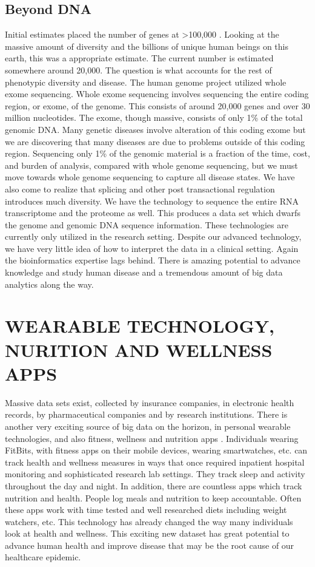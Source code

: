 \documentclass[sigconf]{acmart}
\begin{document}
\subsection{	Beyond DNA}

Initial estimates placed the number of genes at >100,000 \cite{vanderbilt}.  Looking
at the massive amount of diversity and the billions of unique human
beings on this earth, this was a appropriate estimate.  The current
number is estimated somewhere around 20,000.  The question is what
accounts for the rest of phenotypic diversity and disease.  The human
genome project utilized whole exome sequencing.  Whole exome
sequencing involves sequencing the entire coding region, or exome, of
the genome.  This consists of around 20,000 genes and over 30 million
nucleotides.  The exome, though massive, consists of only 1\% of the
total genomic DNA.  Many genetic diseases involve alteration of this
coding exome but we are discovering that many diseases are due to
problems outside of this coding region.  Sequencing only 1\% of the
genomic material is a fraction of the time, cost, and burden of
analysis, compared with whole genome sequencing, but we must move
towards whole genome sequencing to capture all disease states.  We
have also come to realize that splicing and other post transactional
regulation introduces much diversity.  We have the technology to
sequence the entire RNA transcriptome and the proteome as well.  This
produces a data set which dwarfs the genome and genomic DNA sequence
information.  These technologies are currently only utilized in the
research setting.  Despite our advanced technology, we have very
little idea of how to interpret the data in a clinical setting.  Again
the bioinformatics expertise lags behind.  There is amazing potential
to advance knowledge and study human disease and a tremendous amount
of big data analytics along the way.

\section{WEARABLE TECHNOLOGY, NURITION AND WELLNESS APPS}

Massive data sets exist, collected by insurance companies, in
electronic health records, by pharmaceutical companies and by research
institutions.  There is another very exciting source of big data on
the horizon, in personal wearable technologies, and also fitness,
wellness and nutrition apps \cite{fox6}.  Individuals wearing FitBits, with
fitness apps on their mobile devices, wearing smartwatches, etc. can
track health and wellness measures in ways that once required
inpatient hospital monitoring and sophisticated research lab settings.
They track sleep and activity throughout the day and night.  In
addition, there are countless apps which track nutrition and health.
People log meals and nutrition to keep accountable.  Often these apps
work with time tested and well researched diets including weight
watchers, etc.  This technology has already changed the way many
individuals look at health and wellness.  This exciting new dataset
has great potential to advance human health and improve disease that
may be the root cause of our healthcare epidemic.
\end{document}
